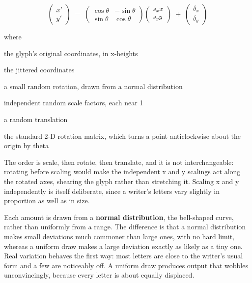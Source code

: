 \begin{equation}
\begin{pmatrix} x' \\ y' \end{pmatrix} \;=\; \begin{pmatrix} \cos\theta & -\sin\theta \\ \sin\theta & \cos\theta \end{pmatrix} \begin{pmatrix} s_x x \\ s_y y \end{pmatrix} \;+\; \begin{pmatrix} \delta_x \\ \delta_y \end{pmatrix}
\end{equation}

\noindent where
\begin{description}[leftmargin=2.4em,style=nextline,font=\normalfont\ttfamily]\setlength\itemsep{1pt}
  \item[{$x,\,y$}] \normalfont the glyph's original coordinates, in x-heights
  \item[{$x',\,y'$}] \normalfont the jittered coordinates
  \item[{$\theta$}] \normalfont a small random rotation, drawn from a normal distribution
  \item[{$s_x,\,s_y$}] \normalfont independent random scale factors, each near 1
  \item[{$\delta_x,\,\delta_y$}] \normalfont a random translation
  \item[{$\begin{pmatrix}\cos\theta & -\sin\theta \\ \sin\theta & \cos\theta\end{pmatrix}$}] \normalfont the standard 2-D rotation matrix, which turns a point anticlockwise about the origin by theta
\end{description}
The order is scale, then rotate, then translate, and it is not interchangeable: rotating before scaling would make the independent x and y scalings act along the rotated axes, shearing the glyph rather than stretching it. Scaling x and y independently is itself deliberate, since a writer's letters vary slightly in proportion as well as in size.


Each amount is drawn from a \textbf{normal distribution}, the bell-shaped curve, rather than uniformly from a range. The difference is that a normal distribution makes small deviations much commoner than large ones, with no hard limit, whereas a uniform draw makes a large deviation exactly as likely as a tiny one. Real variation behaves the first way: most letters are close to the writer's usual form and a few are noticeably off. A uniform draw produces output that wobbles unconvincingly, because every letter is about equally displaced.


